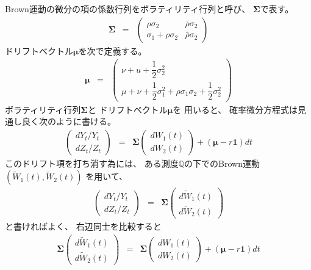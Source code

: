\documentclass[uplatex,a4j,12pt,dvipdfmx]{jsarticle}
\begin{document}
Brown運動の微分の項の係数行列をボラティリティ行列と呼び、
${\bm \Sigma}$で表す。
%
%
\begin{eqnarray*}
	{\bm \Sigma}
	&=&
	\left(
	\begin{array}{cc}
			\rho \sigma_{2}              & \bar{\rho} \sigma_{2}
			\\
			\sigma_{1} + \rho \sigma_{2} & \bar{\rho} \sigma_{2}
		\end{array}
	\right)
\end{eqnarray*}
%
%
ドリフトベクトル${\bm \mu}$を次で定義する。
%
%
\begin{eqnarray*}
	{\bm \mu}
	&=&
	\left(
	\begin{array}{c}
			\nu + u + \dfrac{1}{2} \sigma_{2}^{2}
			\\
			\mu + \nu + \dfrac{1}{2} \sigma_{1}^{2} + \rho \sigma_{1} \sigma_{2} + \dfrac{1}{2} \sigma_{2}^{2}
		\end{array}
	\right)
\end{eqnarray*}
%
%
ボラティリティ行列${\bm \Sigma}$と
ドリフトベクトル${\bm \mu}$を
用いると、
確率微分方程式は見通し良く次のように書ける。
%
%
\begin{eqnarray*}
	\left(
	\begin{array}{c}
			d Y_{t} / Y_{t}
			\\
			d Z_{t} / Z_{t}
		\end{array}
	\right)
	&=&
	{\bm \Sigma}
	\left(
	\begin{array}{c}
			dW_{1}(t)
			\\
			dW_{2}(t)
		\end{array}
	\right)
	+
	( {\bm \mu} - r {\bm 1} ) dt
\end{eqnarray*}
%
%
このドリフト項を打ち消す為には、
ある測度$\mathbb{Q}$の下でのBrown運動
$(\tilde{W}_{1}(t),\tilde{W}_{2}(t))$
を用いて、
%
%
\begin{eqnarray*}
	\left(
	\begin{array}{c}
			d Y_{t} / Y_{t}
			\\
			d Z_{t} / Z_{t}
		\end{array}
	\right)
	&=&
	{\bm \Sigma}
	\left(
	\begin{array}{c}
			d \tilde{W}_{1}(t)
			\\
			d \tilde{W}_{2}(t)
		\end{array}
	\right)
\end{eqnarray*}
%
%
と書ければよく、
右辺同士を比較すると
%
%
\begin{eqnarray*}
	{\bm \Sigma}
	\left(
	\begin{array}{c}
			d \tilde{W}_{1}(t)
			\\
			d \tilde{W}_{2}(t)
		\end{array}
	\right)
	&=&
	{\bm \Sigma}
	\left(
	\begin{array}{c}
			dW_{1}(t)
			\\
			dW_{2}(t)
		\end{array}
	\right)
	+
	( {\bm \mu} - r {\bm 1} ) dt
\end{eqnarray*}
\end{document}
